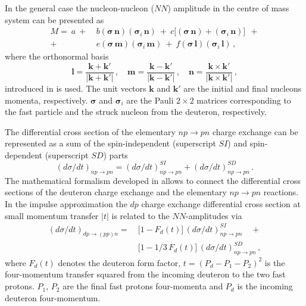 \documentclass[twocolumn,epjc3]{svjour3}
\newcommand{\np}     {\ensuremath{np \rightarrow pn}\xspace}
\newcommand{\dpchex} {\ensuremath{dp \rightarrow (pp)n}\xspace}
\begin{document}
In the general case the nucleon-nucleon ($NN$) amplitude in the centre of mass
system can be presented as \cite{gla02}
\begin{equation}
  \label{eq:mat_full}
  \begin{split}
    M =\ a\ +\ &b
    (\boldsymbol{\sigma}\,\mathbf{n})
    (\boldsymbol{\sigma}_i\,\mathbf{n})\ +\ c\bigl[
    (\boldsymbol{\sigma}\,\mathbf{n}) +
    (\boldsymbol{\sigma}_i\,\mathbf{n})\bigr]\ \ + \\
    +\ &e
    (\boldsymbol{\sigma}\,\mathbf{m})
    (\boldsymbol{\sigma}_i\,\mathbf{m})\ +\ f
    (\boldsymbol{\sigma}\,\mathbf{l})
    (\boldsymbol{\sigma}_i\,\mathbf{l})\,,
  \end{split}
\end{equation}
where the orthonormal basis
\begin{equation}
  \mathbf{l} =
  \frac{\mathbf{k} + \mathbf{k}'}{|\mathbf{k} + \mathbf{k}'|}\,, \quad
  \mathbf{m} =
  \frac{\mathbf{k} - \mathbf{k}'}{|\mathbf{k} - \mathbf{k}'|}\,, \quad
  \mathbf{n} =
  \frac{\mathbf{k} \times \mathbf{k}'}{|\mathbf{k} \times \mathbf{k}'|}\,,
\end{equation}
introduced in \cite{gol66} is used. The unit vectors $\mathbf{k}$ and
$\mathbf{k}'$ are the initial and final nucleons momenta, respectively.
$\boldsymbol{\sigma}$ and $\boldsymbol{\sigma}_i$ are the Pauli $2\times2$
matrices corresponding to the fast particle and the struck nucleon from the
deuteron, respectively.

The differential cross section of the elementary \np charge exchange can be
represented as a sum of the spin-independent (superscript $SI$) and
spin-dependent (superscript $SD$) parts
\begin{equation}
  \label{eq:np_sum}
  (d\sigma/dt)_{\np} = (d\sigma/dt)^{SI}_{\np} + (d\sigma/dt)^{SD}_{\np}\,.
\end{equation}
The mathematical formalism developed in \cite{dea72, dea72_2, bug87} allows to
connect the differential cross sections of the deuteron charge exchange and the
elementary \np reactions. In the impulse approximation the $dp$ charge exchange
differential cross section at small momentum transfer $|t|$ is related to the
$NN$-amplitudes via
\begin{equation}
  \label{eq:dp_13np}
  \begin{split}
    (d\sigma/dt)_{\dpchex} =\ &\bigl[1 - F_d(t)\bigr]\,(d\sigma/dt)^{SI}_{\np}
    \quad + \\
    &\bigl[1 - 1/3\,F_d(t)\bigr]\,(d\sigma/dt)^{SD}_{\np}\,,
  \end{split}
\end{equation}
where $F_d(t)$ denotes the deuteron form factor, $t = (P_d - P_1 - P_2)^2$ is
the four-momentum transfer squared from the incoming deuteron to the two fast
protons. $P_1$, $P_2$ are the final fast protons four-momenta and $P_d$ is the
incoming deuteron four-momentum.
\end{document}

